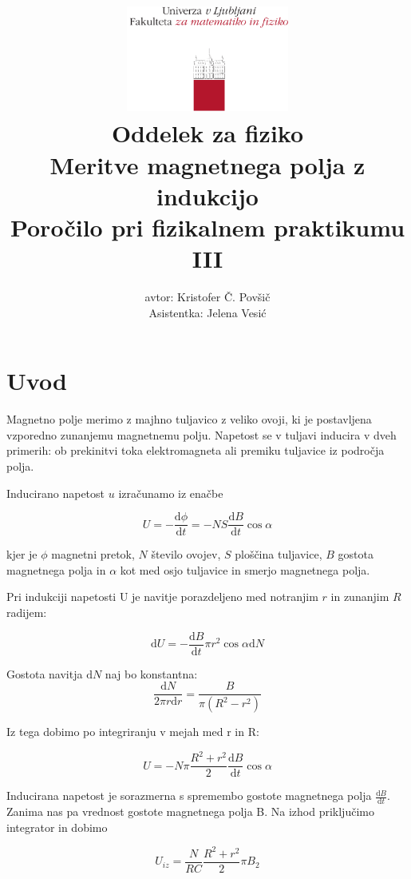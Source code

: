 \documentclass[12pt]{report}
\title{
  \includegraphics[width=0.4\textwidth]{fmf_logo}\\
  {\small Oddelek za fiziko} \\
  {Meritve magnetnega polja z indukcijo }\\
  {\small Poročilo pri fizikalnem praktikumu III}\\

}
\date{}
\author{ avtor: Kristofer Č. Povšič \\[5 cm]
 \small  Asistentka: Jelena Vesić
}
\begin{document}
\setcounter{page}{2}

\maketitle

\chapter*{Uvod}

Magnetno polje merimo z majhno tuljavico z veliko ovoji, ki je postavljena vzporedno zunanjemu magnetnemu polju. Napetost se v tuljavi inducira v dveh primerih: ob prekinitvi toka elektromagneta ali premiku tuljavice iz področja polja. 

Inducirano napetost $u$ izračunamo iz enačbe

\begin{equation}
  U = -\frac{\text{d}\phi}{\text{d}t} = - NS \frac{\text{d}B}{\text{d}t}\cos\alpha
\end{equation}

kjer je $\phi$ magnetni pretok, $N$ število ovojev, $S$ ploščina tuljavice, $B$ gostota magnetnega polja in $\alpha$ kot med osjo tuljavice in smerjo magnetnega polja. 

Pri indukciji napetosti U je navitje porazdeljeno med notranjim $r$ in zunanjim $R$ radijem: 

\begin{equation}
  \text{d}U = -\frac{\text{d}B}{\text{d}t}\pi r^2 \cos \alpha \text{d}N
\end{equation}

Gostota navitja $\text{d}N$ naj bo konstantna: 
\begin{equation}
  \frac{\text{d}N}{2 \pi r \text{d}r} = \frac{B}{\pi (R^2 - r^2)}
\end{equation}

Iz tega dobimo po integriranju v mejah med r in R: 

\begin{equation}
  U = - N\pi \frac{R^2 + r^2}{2} \frac{\text{d}B}{\text{d}t} \cos \alpha
\end{equation}

Inducirana napetost je sorazmerna s spremembo gostote magnetnega polja $\frac{\text{d}B}{\text{d}t}$. Zanima nas pa vrednost gostote magnetnega polja B. Na izhod priključimo integrator in dobimo 

\begin{equation}
  U_{iz} = \frac{N}{RC} \frac{R^2 + r^2}{2} \pi B_2
\end{equation}
\end{document}
